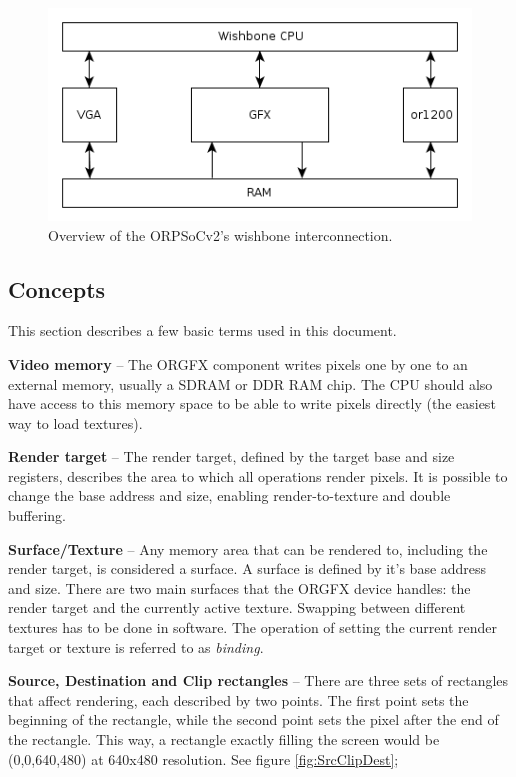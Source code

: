 \documentclass[10pt,a4paper]{article}
\begin{document}
\begin{figure}
\begin{center}
\includegraphics[scale=0.60]{../pictures/topology}
\caption{Overview of the ORPSoCv2's wishbone interconnection.}
\label{fig:topology}
\end{center}
\end{figure}

\subsection{Concepts}
This section describes a few basic terms used in this document.

\textbf{Video memory} -- The ORGFX component writes pixels one by one to an external memory, usually a SDRAM or DDR RAM chip. The CPU should also have access to this memory space to be able to write pixels directly (the easiest way to load textures).

\textbf{Render target} -- The render target, defined by the target base and size registers, describes the area to which all operations render pixels. It is possible to change the base address and size, enabling render-to-texture and double buffering.

\textbf{Surface/Texture} -- Any memory area that can be rendered to, including the render target, is considered a surface. A surface is defined by it's base address and size. There are two main surfaces that the ORGFX device handles: the render target and the currently active texture. Swapping between different textures has to be done in software. The operation of setting the current render target or texture is referred to as \textit{binding}.

\textbf{Source, Destination and Clip rectangles} -- There are three sets of rectangles that affect rendering, each described by two points. The first point sets the beginning of the rectangle, while the second point sets the pixel after the end of the rectangle. This way, a rectangle exactly filling the screen would be (0,0,640,480) at 640x480 resolution. See figure \ref{fig:SrcClipDest};
\end{document}
